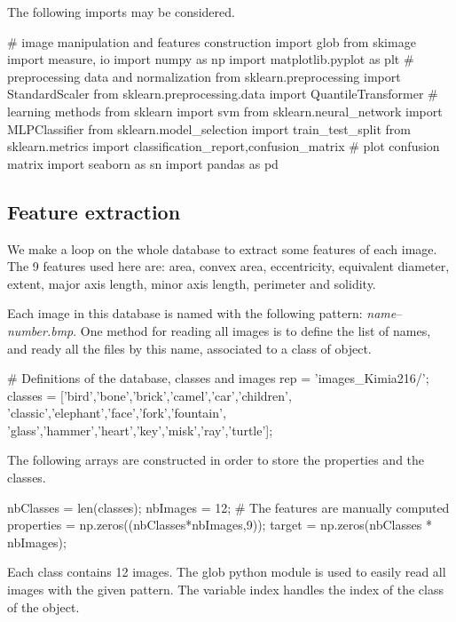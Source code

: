 \def\QRCODE{TB_image_TUT.IMG.machine_learning_pythonqrcode.png}
\def\QRPAGE{http://www.iptutorials.science/tree/master/TB_image/TUT.IMG.machine_learning/python}

The following imports may be considered.
\begin{python}
# image manipulation and features construction
import glob
from skimage import measure, io
import numpy as np
import matplotlib.pyplot as plt
# preprocessing data and normalization
from sklearn.preprocessing import StandardScaler
from sklearn.preprocessing.data import QuantileTransformer
# learning methods
from sklearn import svm
from sklearn.neural_network import MLPClassifier
from sklearn.model_selection import train_test_split
from sklearn.metrics import classification_report,confusion_matrix
# plot confusion matrix
import seaborn as sn
import pandas as pd
\end{python}

\subsection{Feature extraction}
We make a loop on the whole database to extract some features of each image. The 9 features used here are: area, convex area, eccentricity, equivalent diameter, extent, major axis length, minor axis length, perimeter and solidity. 

Each image in this database is named with the following pattern: \textit{name}--\textit{number.bmp}. One method for reading all images is to define the list of names, and ready all the files by this name, associated to a class of object.

\begin{python}
# Definitions of the database, classes and images
rep = 'images_Kimia216/';
classes = ['bird','bone','brick','camel','car','children',
    'classic','elephant','face','fork','fountain',
    'glass','hammer','heart','key','misk','ray','turtle'];
    \end{python}
The following arrays are constructed in order to store the properties and the classes.

\begin{python}
nbClasses = len(classes);
nbImages = 12;
# The features are manually computed
properties = np.zeros((nbClasses*nbImages,9));
target = np.zeros(nbClasses * nbImages);
\end{python}

Each class contains 12 images. The glob python module is used to easily read all images with the given pattern. The variable index handles the index of the class of the object.

